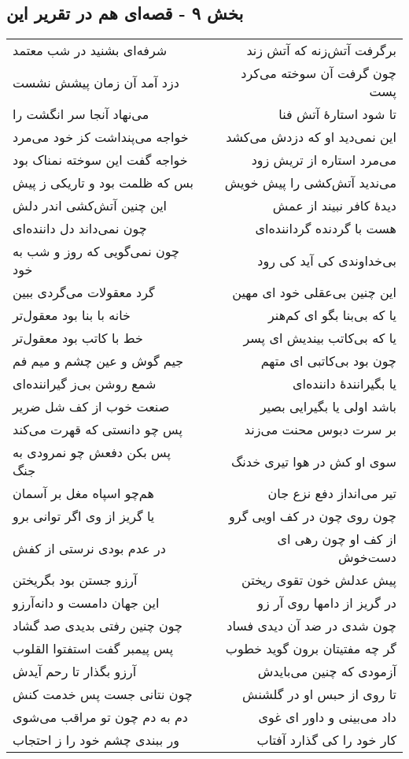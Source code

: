 \begin{center}
\section*{بخش ۹ - قصه‌ای هم در تقریر این}
\label{sec:sh009}
\begin{longtable}{l p{0.5cm} r}
شرفه‌ای بشنید در شب معتمد
&&
برگرفت آتش‌زنه که آتش زند
\\
دزد آمد آن زمان پیشش نشست
&&
چون گرفت آن سوخته می‌کرد پست
\\
می‌نهاد آنجا سر انگشت را
&&
تا شود استارهٔ آتش فنا
\\
خواجه می‌پنداشت کز خود می‌مرد
&&
این نمی‌دید او که دزدش می‌کشد
\\
خواجه گفت این سوخته نمناک بود
&&
می‌مرد استاره از تریش زود
\\
بس که ظلمت بود و تاریکی ز پیش
&&
می‌ندید آتش‌کشی را پیش خویش
\\
این چنین آتش‌کشی اندر دلش
&&
دیدهٔ کافر نبیند از عمش
\\
چون نمی‌داند دل داننده‌ای
&&
هست با گردنده گرداننده‌ای
\\
چون نمی‌گویی که روز و شب به خود
&&
بی‌خداوندی کی آید کی رود
\\
گرد معقولات می‌گردی ببین
&&
این چنین بی‌عقلی خود ای مهین
\\
خانه با بنا بود معقول‌تر
&&
یا که بی‌بنا بگو ای کم‌هنر
\\
خط با کاتب بود معقول‌تر
&&
یا که بی‌کاتب بیندیش ای پسر
\\
جیم گوش و عین چشم و میم فم
&&
چون بود بی‌کاتبی ای متهم
\\
شمع روشن بی‌ز گیراننده‌ای
&&
یا بگیرانندهٔ داننده‌ای
\\
صنعت خوب از کف شل ضریر
&&
باشد اولی یا بگیرایی بصیر
\\
پس چو دانستی که قهرت می‌کند
&&
بر سرت دبوس محنت می‌زند
\\
پس بکن دفعش چو نمرودی به جنگ
&&
سوی او کش در هوا تیری خدنگ
\\
هم‌چو اسپاه مغل بر آسمان
&&
تیر می‌انداز دفع نزع جان
\\
یا گریز از وی اگر توانی برو
&&
چون روی چون در کف اویی گرو
\\
در عدم بودی نرستی از کفش
&&
از کف او چون رهی ای دست‌خوش
\\
آرزو جستن بود بگریختن
&&
پیش عدلش خون تقوی ریختن
\\
این جهان دامست و دانه‌آرزو
&&
در گریز از دامها روی آر زو
\\
چون چنین رفتی بدیدی صد گشاد
&&
چون شدی در ضد آن دیدی فساد
\\
پس پیمبر گفت استفتوا القلوب
&&
گر چه مفتیتان برون گوید خطوب
\\
آرزو بگذار تا رحم آیدش
&&
آزمودی که چنین می‌بایدش
\\
چون نتانی جست پس خدمت کنش
&&
تا روی از حبس او در گلشنش
\\
دم به دم چون تو مراقب می‌شوی
&&
داد می‌بینی و داور ای غوی
\\
ور ببندی چشم خود را ز احتجاب
&&
کار خود را کی گذارد آفتاب
\\
\end{longtable}
\end{center}
